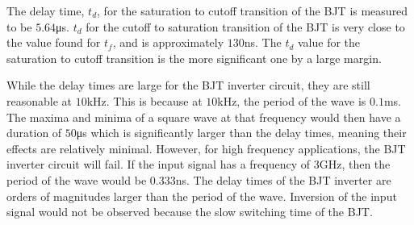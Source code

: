 The delay time, $t_d$, for the saturation to cutoff transition of the BJT is measured to be $5.64$\si{\micro\second}. $t_d$ for the cutoff to saturation transition of the BJT is very close to the value found for $t_f$, and is approximately $130$\si{\nano\second}. The $t_d$ value for the saturation to cutoff transition is the more significant one by a large margin.

While the delay times are large for the BJT inverter circuit, they are still reasonable at $10$\si{\kilo\hertz}. This is because at $10$\si{\kilo\hertz}, the period of the wave is $0.1$\si{\milli\second}. The maxima and minima of a square wave at that frequency would then have a duration of $50$\si{\micro\second} which is significantly larger than the delay times, meaning their effects are relatively minimal. However, for high frequency applications, the BJT inverter circuit will fail. If the input signal has a frequency of $3$\si{\giga\hertz}, then the period of the wave would be $0.333$\si{\nano\second}. The delay times of the BJT inverter are orders of magnitudes larger than the period of the wave. Inversion of the input signal would not be observed because the slow switching time of the BJT.